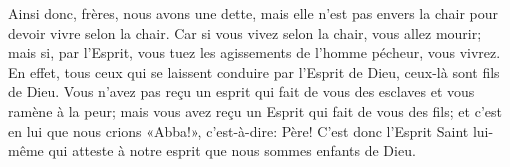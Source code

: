 Ainsi donc, frères, nous avons une dette,
	mais elle n’est pas envers la chair pour devoir vivre selon la chair.
Car si vous vivez selon la chair, vous allez mourir;
	mais si, par l’Esprit, vous tuez les agissements de l’homme pécheur,
	vous vivrez.
En effet, tous ceux qui se laissent conduire par l’Esprit de Dieu,
	ceux-là sont fils de Dieu.
Vous n’avez pas reçu un esprit qui fait de vous des esclaves
		et vous ramène à la peur;
	mais vous avez reçu un Esprit qui fait de vous des fils;
	et c’est en lui que nous crions «Abba!», c’est-à-dire: Père!
C’est donc l’Esprit Saint lui-même qui atteste à notre esprit
		que nous sommes enfants de Dieu.

